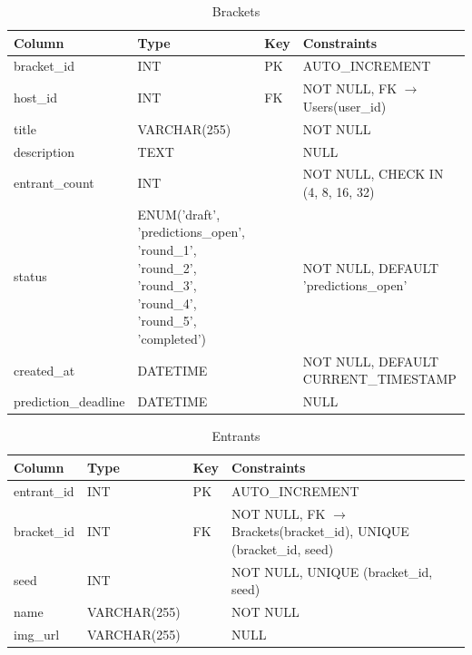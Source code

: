 \documentclass[11pt]{article}
\begin{document}
\begin{table}[ht]
\centering
\caption{Brackets}
\begin{tabular}{|p{3.2cm}|p{3.8cm}|p{1.2cm}|p{5.3cm}|}
\hline
Column & Type & Key & Constraints \\ \hline
bracket\_id & INT & PK & AUTO\_INCREMENT \\ \hline
host\_id & INT & FK & NOT NULL, FK $\rightarrow$ Users(user\_id) \\ \hline
title & VARCHAR(255) &  & NOT NULL \\ \hline
description & TEXT &  & NULL \\ \hline
entrant\_count & INT &  & NOT NULL, CHECK IN (4, 8, 16, 32) \\ \hline
status & ENUM('draft', 'predictions\_open', 'round\_1', 'round\_2', 'round\_3', 'round\_4', 'round\_5', 'completed') &  & NOT NULL, DEFAULT 'predictions\_open' \\ \hline
created\_at & DATETIME &  & NOT NULL, DEFAULT CURRENT\_TIMESTAMP \\ \hline
prediction\_deadline & DATETIME &  & NULL \\ \hline
\end{tabular}
\end{table}

\begin{table}[ht]
\centering
\caption{Entrants}
\begin{tabular}{|p{3.2cm}|p{3.8cm}|p{1.2cm}|p{5.3cm}|}
\hline
Column & Type & Key & Constraints \\ \hline
entrant\_id & INT & PK & AUTO\_INCREMENT \\ \hline
bracket\_id & INT & FK & NOT NULL, FK $\rightarrow$ Brackets(bracket\_id), UNIQUE (bracket\_id, seed) \\ \hline
seed & INT &  & NOT NULL, UNIQUE (bracket\_id, seed) \\ \hline
name & VARCHAR(255) &  & NOT NULL \\ \hline
img\_url & VARCHAR(255) &  & NULL \\ \hline
\end{tabular}
\end{table}
\end{document}
